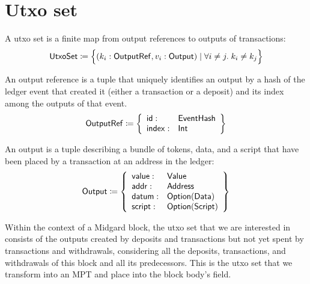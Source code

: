 \documentclass[../midgard.tex]{subfiles}
\begin{document}
\section{Utxo set}
\label{h:utxo-set}

A utxo set is a finite map from output references to outputs of transactions:
\begin{equation*}
    \mathsf{UtxoSet} \coloneq \Bigl\{
        (k_i: \mathsf{OutputRef}, v_i: \mathsf{Output}) \mid \forall i \neq j.\; k_i \neq k_j
    \Bigr\}
\end{equation*}

An output reference is a tuple that uniquely identifies an output by a hash of the ledger event that created it (either a transaction or a deposit) and its index among the outputs of that event.
\begin{equation*}
    \mathsf{OutputRef} \coloneq \left\{
    \begin{array}{ll}
        \mathsf{id} : & \mathsf{EventHash} \\
        \mathsf{index} : & \mathsf{Int}
    \end{array} \right\}
\end{equation*}

An output is a tuple describing a bundle of tokens, data, and a script that have been placed by a transaction at an address in the ledger:
\begin{equation*}
    \mathsf{Output} \coloneq \left\{
    \begin{array}{ll}
        \mathsf{value} : & \mathsf{Value} \\
        \mathsf{addr} : & \mathsf{Address} \\
        \mathsf{datum} : & \mathsf{Option(Data)} \\
        \mathsf{script} : & \mathsf{Option(Script)}
    \end{array} \right\}
\end{equation*}

Within the context of a Midgard block, the utxo set that we are interested in consists of the outputs created by deposits and transactions but not yet spent by transactions and withdrawals, considering all the deposits, transactions, and withdrawals of this block and all its predecessors. This is the utxo set that we transform into an MPT and place into the block body's  field.


\todo

\todo

\todo
\end{document}

